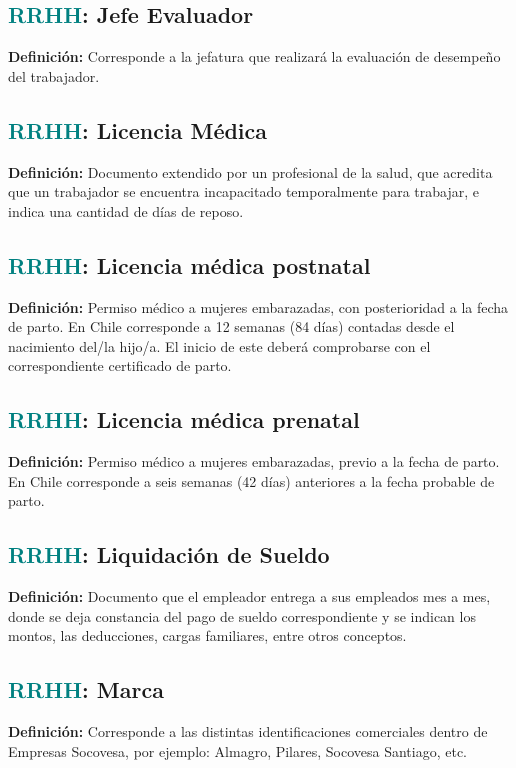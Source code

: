 \documentclass[12pt]{article}
\begin{document}
\subsection{\textcolor{teal}{RRHH}: Jefe Evaluador}
\textbf{Definición:} Corresponde a la jefatura que realizará la evaluación de desempeño del trabajador.
\subsection{\textcolor{teal}{RRHH}: Licencia Médica}
\textbf{Definición:} Documento extendido por un profesional de la salud, que acredita que un trabajador se encuentra incapacitado temporalmente para trabajar, e indica una cantidad de días de reposo.
\subsection{\textcolor{teal}{RRHH}: Licencia médica postnatal}
\textbf{Definición:} Permiso médico a mujeres embarazadas, con posterioridad a la fecha de parto. En Chile corresponde a 12 semanas (84 días) contadas desde el nacimiento del/la hijo/a. El inicio de este deberá comprobarse con el correspondiente certificado de parto.
\subsection{\textcolor{teal}{RRHH}: Licencia médica prenatal}
\textbf{Definición:} Permiso médico a mujeres embarazadas, previo a la fecha de parto. En Chile corresponde a seis semanas (42 días) anteriores a la fecha probable de parto.
\subsection{\textcolor{teal}{RRHH}: Liquidación de Sueldo}
\textbf{Definición:} Documento que el empleador entrega a sus empleados mes a mes, donde se deja constancia del pago de sueldo correspondiente y se indican los montos, las deducciones, cargas familiares, entre otros conceptos.
\subsection{\textcolor{teal}{RRHH}: Marca}
\textbf{Definición:} Corresponde a las distintas identificaciones comerciales dentro de Empresas Socovesa, por ejemplo: Almagro, Pilares, Socovesa Santiago, etc.
\end{document}
